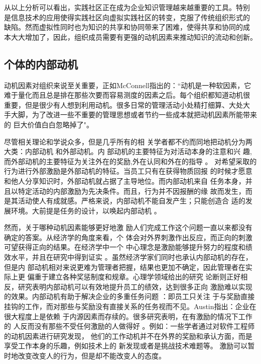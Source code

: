 从以上分析可以看出，实践社区正在成为企业知识管理越来越重要的工具。特别
是信息技术的应用使得实践社区向虚拟实践社区的转变，克服了传统组织形式的
缺陷。然而虚拟性同时也为知识的共享和协同带来了困难，使得共享和协同的成
本大大增加了，因此，组织成员需要有更强的动机因素来推动知识的流动和创新。



\subsection{个体的内部动机}



动机因素对组织来说至关重要，正如McConnell指出的：“动机是一种软因素，它
难于量化而且总是排在那些次要而容易测度的因素之后。每个组织都知道动机很
重要，但是很少有人想到利用动机。很多日常的管理活动小处精打细算、大处大
手大脚，为了改进一些不重要的管理思想或者节约一些成本就把动机因素所能带来的
巨大价值白白忽略掉了"\cite{663801}。

尽管相关理论和学说众多，但是几乎所有的相
关学者都不约而同地把动机分为两大类：内部动机
和外部动机\cite{sansone2000iae}。内
部动机的主要特征为对活动本身的注意和兴
趣,而外部动机的主要特征为关注外在的奖励,外在认同和外在的指导
\cite{collins1999mac}。
对希望采取的行为进行外部激励是外部动机的特征。当员工只有在获得物质回报
的时候才愿意和他人分享知识时，外部动机就占据了主导地位。而内部动机来自
任务本身，并且以特定活动的内部激励为先决条件。而且，行为并不因报酬的缘
故而发生，而是其活动使人有成就感。严格来说，内部动机不能自发产生；只能创造合
适的发展环境。大前提是任务的设计，以唤起内部动机
\cite{KaiMertins2003}。



然而，关于哪种动机因素能够更好地激
励人们完成工作这个问题一直以来都没有确定的答案。从经济学的角度来看，个
体会对外界刺激作出反应，而正向的刺激可望获得正向的结果。在经济学中一个
中心理念是激励能够提升努力的程度和绩效水平，并且在研究中得到证实
\cite{388530120001201}。虽然经济学家们同时也承认内部动机的存在，但是内
部动机相对来说更难为管理者把握，结果也更加不确定，因此管理者在实际上更
偏重于建立各种奖惩制度和规章\cite{argyris1998ee}。心理学领域给出的研究
论断则正好相反，研究表明内部动机可以有效地提升员工的绩效，达到很多正向
激励难以实现的效果。内部动机有助于解决企业的多重任务问题
\cite{gibbons1998io,holmstrom1991mpa,prendergast1999pif}：即员工只关注
于与奖励直接挂钩的工作，而对那些与奖励没有直接关系的任务视而不见。Austin指出：企业在很大程度上是依赖
于内源因素而存续的\cite{austin1996mam}。很多研究表明，在有激励的情况下工作的
人反而没有那些不受任何激励的人做得好
\cite{Deci1975,wilson1981aas,kruglanski1971eei,lepper1973ucs}
。例如：一些学者通过对软件工程师的动机因素进行研究发现，
他们的工作动机并不在外界的奖励和承认方面，而是享受工作本身的乐趣，例如技术上的
新发现或者是挑战技术难题等\cite{1252263,1125221}。
激励可以暂时地改变改变人的行为，但是却不能改变人的态度。



